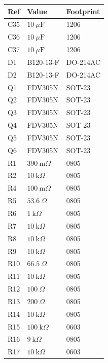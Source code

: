 \documentclass[10pt,letterpaper]{article}
\begin{document}
\begin{tabular}[t]{@{}lll@{}}\toprule Ref & Value & Footprint\\\midrule
C35 & $10\:\mu\text{F}$ & 1206\\
C36 & $10\:\mu\text{F}$ & 1206\\
C37 & $10\:\mu\text{F}$ & 1206\\
D1 & B120-13-F & DO-214AC\\
D2 & B120-13-F & DO-214AC\\
Q1 & FDV305N & SOT-23\\
Q2 & FDV305N & SOT-23\\
Q3 & FDV305N & SOT-23\\
Q4 & FDV305N & SOT-23\\
Q5 & FDV305N & SOT-23\\
Q6 & FDV305N & SOT-23\\
R1 & $390\:\text{m}\Omega$ & 0805\\
R2 & $10\:\text{k}\Omega$ & 0805\\
R4 & $100\:\text{m}\Omega$ & 0805\\
R5 & $53.6\:\Omega$ & 0805\\
R6 & $1\:\text{k}\Omega$ & 0805\\
R7 & $10\:\text{k}\Omega$ & 0805\\
R8 & $10\:\text{k}\Omega$ & 0805\\
R9 & $10\:\text{k}\Omega$ & 0805\\
R10 & $66.5\:\Omega$ & 0805\\
R11 & $10\:\text{k}\Omega$ & 0805\\
R12 & $100\:\Omega$ & 0805\\
R13 & $200\:\Omega$ & 0805\\
R14 & $10\:\text{k}\Omega$ & 0805\\
R15 & $100\:\text{k}\Omega$ & 0603\\
R16 & $9\:\text{k}\Omega$ & 0805\\
R17 & $10\:\text{k}\Omega$ & 0603\\
\bottomrule\end{tabular}\hfill
\end{document}
